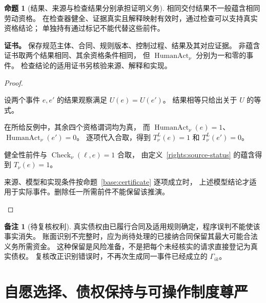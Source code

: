 \documentclass[UTF8,12pt,a4paper,openany,fontset=none,zihao=false]{ctexrep}
\theoremstyle{definition}
\newtheorem{proposition}{命题}[chapter]
\newtheorem{remark}{备注}[chapter]
\newenvironment{certificate}{\par\noindent\textbf{证书。}\ignorespaces}{\par}
\newcommand{\1}{\mathbf 1}
\begin{document}
\begin{proposition}[结果、来源与检查结果分别承担证明义务]
\label{rights:source-evidence}
相同交付结果不一般蕴含相同劳动资格。
在检查器健全、证据真实且解释映射有效时，通过检查可以支持真实资格结论；
单独持有通过标记不能代替这些前件。
\end{proposition}
\begin{certificate}
保存规范主体、合同、规则版本、控制过程、结果及其对应证据。
非蕴含证书取两个结果相同、其余资格条件相同，
但 \(\operatorname{HumanAct}_\nu\) 分别为一和零的事件。
检查结论的适用证书另核验来源、解释和实现。
\end{certificate}
\begin{proof}
\begin{semanticsteps}
\item 设两个事件 \(e,e'\) 的结果观察满足 \(U(e)=U(e')\)。
结果相等只给出关于 \(U\) 的等式。
\item 在所给反例中，其余四个资格谓词均为真，
而 \(\operatorname{HumanAct}_\nu(e)=1\)、\(\operatorname{HumanAct}_\nu(e')=0\)。
逐项代入合取，得到 \(T^L_\nu(e)=1\) 和 \(T^L_\nu(e')=0\)。
\item 健全性前件与 \(\operatorname{Check}_\nu(\ell,e)=1\) 合取，
由定义~\ref{rights:source-status} 的蕴含得到 \(T_\nu(e)=1\)。
\item 来源、模型和实现条件按命题~\ref{base:certificate} 逐项成立时，
上述模型结论才适用于实际事件。删除任一所需前件不能保留该推演。
\end{semanticsteps}
\end{proof}

\begin{remark}[待复核权利]
真实债权由已履行合同及适用规则确定，程序误判不能使该事实消失。
账面识别不完整时，应为尚待处理的已接纳合同保留其最大可能合法义务所需资金。
这种保留是风险准备，不是把每个未经核实的请求直接登记为真实债权。
复核改正识别错误时，不再次生成同一事件已经成立的 \(\Gamma_{ik}\)。
\end{remark}

\section{自愿选择、债权保持与可操作制度尊严}
\end{document}
